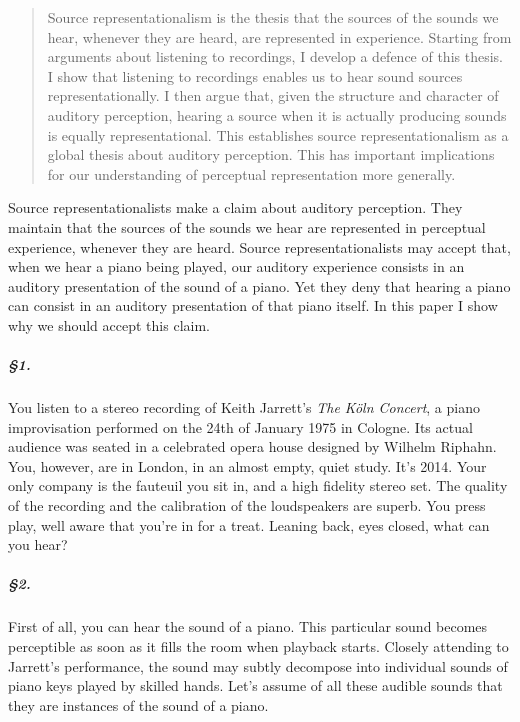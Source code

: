 \documentclass[sloppy, journal, git, anonymise]{humapap}
\date{}
\begin{document}
  
\documenttitle	




% 
\begin{abstract}
\noindent Source representationalism is the thesis that the sources of the sounds
we hear, whenever they are heard, are represented in experience.
Starting from arguments about listening to recordings, I develop a
defence of this thesis. I show that listening to recordings enables us
to hear sound sources representationally. I then argue that, given the
structure and character of auditory perception, hearing a source when it
is actually producing sounds is equally representational. This
establishes source representationalism as a global thesis about auditory
perception. This has important implications for our understanding of
perceptual representation more generally.
\end{abstract}

\noindent Source representationalists make a claim about auditory perception. They
maintain that the sources of the sounds we hear are represented in
perceptual experience, whenever they are heard. Source
representationalists may accept that, when we hear a piano being played,
our auditory experience consists in an auditory presentation of the
sound of a piano. Yet they deny that hearing a piano can consist in an
auditory presentation of that piano itself. In this paper I show why we
should accept this claim.

\subparagraph{§1.}\label{section}

You listen to a stereo recording of Keith Jarrett's \emph{The Köln
Concert}, a piano improvisation performed on the 24th of January 1975 in
Cologne. Its actual audience was seated in a celebrated opera house
designed by Wilhelm Riphahn. You, however, are in London, in an almost
empty, quiet study. It's 2014. Your only company is the fauteuil you sit
in, and a high fidelity stereo set. The quality of the recording and the
calibration of the loudspeakers are superb. You press play, well aware
that you're in for a treat. Leaning back, eyes closed, what can you
hear?

\subparagraph{§2.}\label{section-1}

First of all, you can hear the sound of a piano. This particular sound
becomes perceptible as soon as it fills the room when playback starts.
Closely attending to Jarrett's performance, the sound may subtly
decompose into individual sounds of piano keys played by skilled hands.
Let's assume of all these audible sounds that they are instances of the
sound of a piano.
\end{document}
